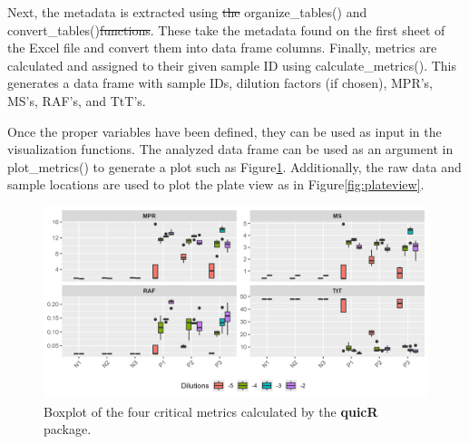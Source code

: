 \documentclass[preprint,12pt,a4paper]{elsarticle}
\providecommand{\DIFaddtex}[1]{{\protect\color{blue}\uwave{#1}}} %
\providecommand{\DIFdeltex}[1]{{\protect\color{red}\sout{#1}}} %
\providecommand{\DIFaddbegin}{} %
\providecommand{\DIFaddend}{} %
\providecommand{\DIFdelbegin}{} %
\providecommand{\DIFdelend}{} %
\providecommand{\DIFadd}[1]{\texorpdfstring{\DIFaddtex{#1}}{#1}} %
\providecommand{\DIFdel}[1]{\texorpdfstring{\DIFdeltex{#1}}{}} %
\begin{document}
            Next, the metadata is extracted using \DIFdelbegin \DIFdel{the }\DIFdelend organize\_tables() and convert\_tables()\DIFdelbegin \DIFdel{functions}\DIFdelend . These take the metadata found on the first sheet of the Excel file and convert them into data frame columns. Finally, metrics are calculated and assigned to their given sample ID using calculate\_metrics(). This generates a data frame with sample IDs, dilution factors (if chosen), MPR's, MS's, RAF's, and TtT's.

            Once the proper variables have been defined, they can be used as input in the visualization functions. The analyzed data frame can be used as an argument in plot\_metrics() to generate a plot such as Figure\DIFaddbegin \DIFadd{~}\DIFaddend \ref{fig:boxplot}. Additionally, the raw data and sample locations are used to plot the plate view as in Figure\DIFaddbegin \DIFadd{~}\DIFaddend \ref{fig:plateview}.

            \begin{figure}[ht]
                \centering
                \includegraphics[width=\textwidth]{images/boxplot.png}
                \caption{Boxplot of the four critical metrics calculated by the \textbf{quicR} package.}\label{fig:boxplot}
            \end{figure}
\end{document}
